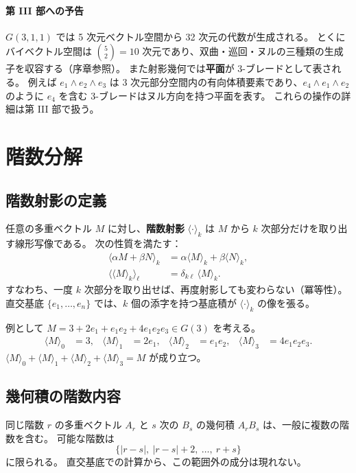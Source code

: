 \documentclass[dvipdfmx,a4paper,oneside]{jsbook}
\numberwithin{equation}{chapter}
\begin{document}
\paragraph{第 III 部への予告}
\(G(3,1,1)\) では 5 次元ベクトル空間から 32 次元の代数が生成される。
とくにバイベクトル空間は \(\binom{5}{2}=10\) 次元であり、双曲・巡回・ヌルの三種類の生成子を収容する（序章参照）。
また射影幾何では\textbf{平面}が 3-ブレードとして表される。
例えば \(e_1\wedge e_2\wedge e_3\) は 3 次元部分空間内の有向体積要素であり、\(e_4\wedge e_1\wedge e_2\) のように \(e_4\) を含む 3-ブレードはヌル方向を持つ平面を表す。
これらの操作の詳細は第 III 部で扱う。

\section{階数分解}

\subsection{階数射影の定義}

任意の多重ベクトル \(M\) に対し、\textbf{階数射影} \(\langle\cdot\rangle_k\) は \(M\) から \(k\) 次部分だけを取り出す線形写像である。
次の性質を満たす：
\begin{align}
  \langle \alpha M + \beta N \rangle_k &= \alpha\langle M \rangle_k + \beta\langle N \rangle_k,
  \label{eq:grade-linear} \\
  \langle \langle M \rangle_k \rangle_\ell &= \delta_{k\ell}\,\langle M \rangle_k.
  \label{eq:grade-idempotent}
\end{align}
すなわち、一度 \(k\) 次部分を取り出せば、再度射影しても変わらない（冪等性）。
直交基底 \(\{e_1,\ldots,e_n\}\) では、\(k\) 個の添字を持つ基底積が \(\langle\cdot\rangle_k\) の像を張る。

例として \(M = 3 + 2e_1 + e_1 e_2 + 4e_1 e_2 e_3 \in G(3)\) を考える。
\begin{align}
  \langle M \rangle_0 &= 3, &
  \langle M \rangle_1 &= 2e_1, &
  \langle M \rangle_2 &= e_1 e_2, &
  \langle M \rangle_3 &= 4e_1 e_2 e_3.
\end{align}
\(\langle M \rangle_0 + \langle M \rangle_1 + \langle M \rangle_2 + \langle M \rangle_3 = M\) が成り立つ。

\subsection{幾何積の階数内容}

同じ階数 \(r\) の多重ベクトル \(A_r\) と \(s\) 次の \(B_s\) の幾何積 \(A_r B_s\) は、一般に複数の階数を含む。
可能な階数は
\begin{equation}
  \{|r-s|,\ |r-s|+2,\ \ldots,\ r+s\}
  \label{eq:grade-range}
\end{equation}
に限られる。
直交基底での計算から、この範囲外の成分は現れない。
\end{document}
